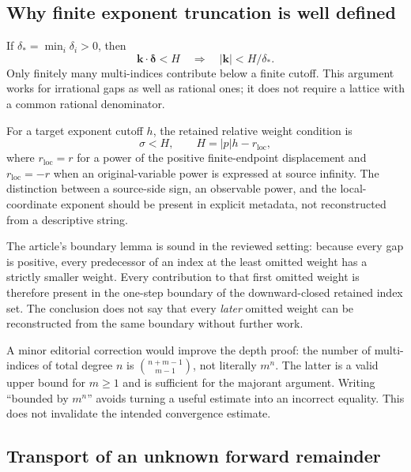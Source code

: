\documentclass[11pt,a4paper]{article}
\theoremstyle{definition}
\begin{document}
\subsection{Why finite exponent truncation is well defined}

If $\delta_* = \min_i\delta_i>0$, then
\[
 \boldsymbol k\cdot\boldsymbol\delta<H
 \quad\Longrightarrow\quad |\boldsymbol k|<H/\delta_*.
\]
Only finitely many multi-indices contribute below a finite cutoff. This argument works for irrational gaps as well as rational ones; it does not require a lattice with a common rational denominator.

For a target exponent cutoff $h$, the retained relative weight condition is
\begin{equation}
 \sigma<H,\qquad H=|p|h-r_{\mathrm{loc}},
 \label{eq:weight-cutoff}
\end{equation}
where $r_{\mathrm{loc}}=r$ for a power of the positive finite-endpoint displacement and $r_{\mathrm{loc}}=-r$ when an original-variable power is expressed at source infinity. The distinction between a source-side sign, an observable power, and the local-coordinate exponent should be present in explicit metadata, not reconstructed from a descriptive string.

The article's boundary lemma is sound in the reviewed setting: because every gap is positive, every predecessor of an index at the least omitted weight has a strictly smaller weight. Every contribution to that first omitted weight is therefore present in the one-step boundary of the downward-closed retained index set. The conclusion does not say that every \emph{later} omitted weight can be reconstructed from the same boundary without further work.\cite{remainders}

A minor editorial correction would improve the depth proof: the number of multi-indices of total degree $n$ is $\binom{n+m-1}{m-1}$, not literally $m^n$. The latter is a valid upper bound for $m\ge1$ and is sufficient for the majorant argument. Writing ``bounded by $m^n$'' avoids turning a useful estimate into an incorrect equality. This does not invalidate the intended convergence estimate.\cite{remainders}

\subsection{Transport of an unknown forward remainder}
\end{document}
